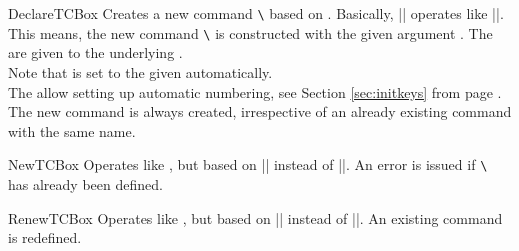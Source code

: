 \begin{docCommand}{DeclareTCBox}{}
  Creates a new command \texttt{\textbackslash} based on .
  Basically, |\DeclareTCBox| operates like |\DeclareDocumentCommand|. This means,
  the new command \texttt{\textbackslash} is constructed with the given argument .
  The  are given to the underlying .\\
  Note that  is set to the given 
  automatically.\\
  The  allow setting up automatic numbering,
  see Section \ref{sec:initkeys} from page \pageref{sec:initkeys}.\\
  The new command is always created, irrespective of an already existing
  command with the same name.

\end{docCommand}

\begin{docCommand}{NewTCBox}{}
  Operates like , but based on |\NewDocumentCommand| instead of |\DeclareDocumentCommand|.
  An error is issued if \texttt{\textbackslash} has already been defined.
\end{docCommand}

\begin{docCommand}{RenewTCBox}{}
  Operates like , but based on |\RenewDocumentCommand| instead of |\DeclareDocumentCommand|.
  An existing command is redefined.
\end{docCommand}

